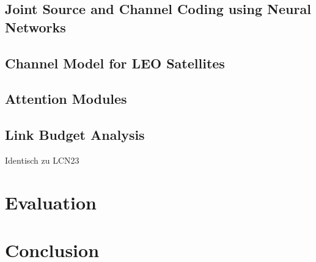 \documentclass[conference]{IEEEtran}
\begin{document}
\subsection{Joint Source and Channel Coding using Neural Networks}

\subsection{Channel Model for LEO Satellites}

\subsection{Attention Modules}

\subsection{Link Budget Analysis}
Identisch zu LCN23

\section{Evaluation}
\label{sec:evaluation}

\section{Conclusion}
\label{sec:conclusion}



\end{document}
